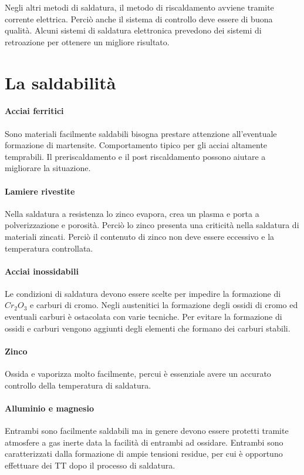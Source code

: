 Negli altri metodi di saldatura, il metodo di riscaldamento avviene tramite corrente elettrica. Perciò anche il sistema di controllo deve essere di buona qualità. Alcuni sistemi di saldatura elettronica prevedono dei sistemi di retroazione per ottenere un migliore risultato.

\section{La saldabilità}
\paragraph{Acciai ferritici} Sono materiali facilmente saldabili bisogna prestare attenzione all'eventuale formazione di martensite. Comportamento tipico per gli acciai altamente temprabili.
Il preriscaldamento e il post riscaldamento possono aiutare a migliorare la situazione.
\paragraph{Lamiere rivestite}
Nella saldatura a resistenza lo zinco evapora, crea un plasma e porta a polverizzazione e porosità.
Perciò lo zinco presenta una criticità nella saldatura di materiali zincati. Perciò il contenuto di zinco non deve essere eccessivo e la temperatura controllata.
\paragraph{Acciai inossidabili}
Le condizioni di saldatura devono essere scelte per impedire la formazione di $Cr_2O_3$ e carburi di cromo.
Negli austenitici la formazione degli ossidi di cromo ed eventuali carburi è ostacolata con varie tecniche.
Per evitare la formazione di ossidi e carburi vengono aggiunti degli elementi che formano dei carburi stabili.
\paragraph{Zinco} Ossida e vaporizza molto facilmente, percui è essenziale avere un accurato controllo della temperatura di saldatura.
\paragraph{Alluminio e magnesio} Entrambi sono facilmente saldabili ma in genere devono essere protetti tramite atmosfere a gas inerte data la facilità di entrambi ad ossidare. Entrambi sono caratterizzati dalla formazione di ampie tensioni residue, per cui è opportuno effettuare dei \ac{TT} dopo il processo di saldatura.

